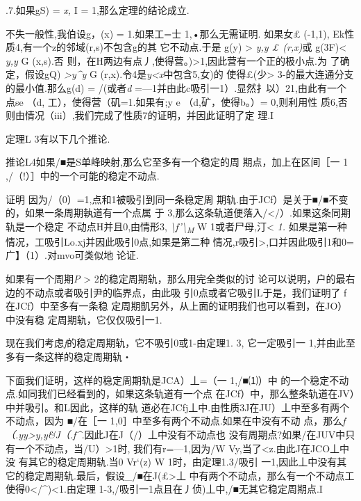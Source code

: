 \documentclass{article}
\begin{document}
.7.如果gS) = \emph{x,} I = 1,那么定理的结论成立.

不失一般性,我伯设g，(x) = 1.如果工=士 1,•那么无需证明. 如果女£ (-1,1),
Ek性质4,有一个z的邻域(r,s)不包含g的其 它不动点.于是 g(y) \textgreater{}
\emph{y,y £ (r,x)}或 g(3F)\textless{} \emph{y,y} G (x,s).否
则，在H两边有点丿,使得营。)\textgreater{}1,因此营有一个正的极小点.为
了确定，假设gQ) \emph{\textgreater{}y\^{}y} G
(r,x).令4是\emph{y\textless{}x}中包含5,女)的 使得£(少\textgreater{}
3-的最大连通分支的最小值.那么g(d) = /(或者\emph{d}
=---1并由此c吸引一1）.显然扌以）21,由此有一个点se （d,
工），使得营（矶=1.如果有;y e （d,矿，使得b。）= 0,则利用性
质6,否则由情况（iii）,我们完成了性质7的证明，并因此证明了定 理.I

定理L 3有以下几个推论.

推论L4如果/■是S单峰映射,那么它至多有一个稳定的周 期点，加上在区间［一 1
,/（!）］中的一个可能的稳定不动点.

证明 因为/（0）=1,点和1被吸引到同一条稳定周
期轨.由于JCf）是关于■/■不变的，如果一条周期執道有一个点属 于
3,那么这条轨道便落入/\textless{}/）.如果这条同期轨是一个稳定
不动点H并且0,由情形3,
\emph{\textbackslash{}f'\textbackslash{}\textsubscript{M}} W
1或者\textbar{}尸\textbar{}母,汀\textless{} \emph{1.}
如果是第一种情况，工吸引Lo.xj并因此吸引0点,如果是第二种
情况,r吸引\textbar{}\textgreater{},口并因此吸引1和0=广】（1）.对mvo可类似地
论证.

如果有一个周期\emph{P} \textgreater{} 2的稳定周期轨，那么用完全类似的讨
论可以说明，户的最右边的不动点或者吸引尹的临界点，由此吸
引0点或者它吸引L于是，我们证明了 f在JCf）中至多有一条稳
定周期凱另外，从上面的证明我们也可以看到，在JO）中没有稳
定周期轨，它仅仅吸引一1.

现在我们考虑\emph{f}的稳定周期轨，它不吸引0或1-由定理1. 3, 它一定吸引一
1,并由此至多有一条这样的稳定周期轨・

下面我们证明，这样的稳定周期轨是JCA）丄=（一 1,/■⑴）中
的一个稳定不动点.如同我们已经看到的，如果这条轨道有一个点
在JCf）中，那么整条轨道在JV）中并吸引。和L因此，这样的轨
道必在JCfj丄中.由性质3J在JU）丄中至多有两个不动点，因为 ■/在［一
1,0］中至多有两个不动点.如果在中没有不动
点，那么\emph{f（.yy\textgreater{}y,y\&J（.f\^{}.}因此J在J（/）丄中没有不动点也
没有周期点?如果/在JUV中只有一个不动点，当/U）\textgreater{}1时,
我们有r=---1,因为/W Vy,当了\textless{}z.由此J在JCO丄中没
有其它的稳定周期轨.当0 Vr`(z) W 1时，由定理1.3/吸引
一1,因此丄中没有其它的稳定周期轨.最后，假设\_/■在J(£\textgreater{}丄
中有两个不动点，那么有一个不动点工使得0\textless{}/\^{})\textless{}1.由定理
1-3,/吸引一1点且在丿侦)丄中,/■无其它稳定周期点.I
\end{document}
